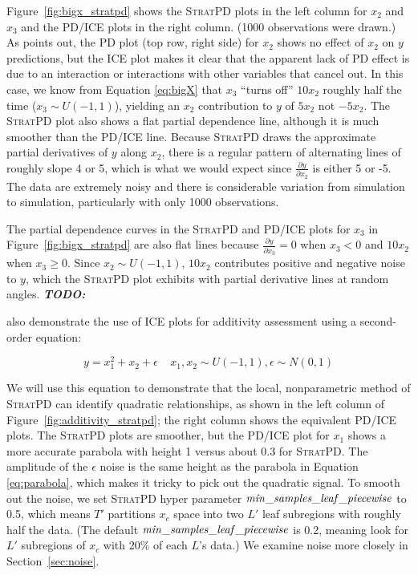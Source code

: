 \documentclass[12pt]{article}
\newcommand{\secref}[1]{Section~\ref{#1}}
\newcommand{\figref}[1]{Figure~\ref{#1}}
\newcommand{\todo}[1]{{\bf\em TODO:} {{\color{red}{#1}}}}
\newcommand{\spd}{\fontfamily{cmr}\textsc{\small StratPD}}
\begin{document}
\noindent \figref{fig:bigx_stratpd} shows the \spd{} plots in the left column for $x_2$ and $x_3$ and the PD/ICE plots in the right column. (1000 observations were drawn.) As \cite{ICE} points out, the PD plot (top row, right side) for $x_2$ shows no effect of $x_2$ on $y$ predictions, but the ICE plot makes it clear that the apparent lack of PD effect is due to an interaction or interactions with other variables that cancel out. In this case, we know from Equation \eqref{eq:bigX} that $x_3$ ``turns off'' $10 x_2$ roughly half the time ($x_3 \sim U(-1,1)$), yielding an $x_2$ contribution to $y$ of $5 x_2$ not $-5 x_2$. The \spd{} plot also shows a flat partial dependence line, although it is much smoother than the PD/ICE line. Because \spd{} draws the approximate partial derivatives of $y$ along $x_2$, there is a regular pattern of alternating lines of roughly slope 4 or 5, which is what we would expect since $\frac{\partial y}{\partial x_2}$ is either 5 or -5. The data are extremely noisy and there is considerable variation from simulation to simulation, particularly with only 1000 observations.

The partial dependence curves in the \spd{} and PD/ICE plots for $x_3$ in \figref{fig:bigx_stratpd} are also flat lines because $\frac{\partial y}{\partial x_3}=0$ when $x_3 < 0$ and $10 x_2$ when $x_3 \ge 0$. Since $x_2 \sim U(-1,1)$, $10 x_2$ contributes positive and negative noise to $y$, which the \spd{} plot exhibits with partial derivative lines at random angles.   \todo{James: can you check the ICE paper when they describe that the interactions of $x_3$ are just around 0?  From the equation they are clearly $\ge 0$.}

\cite{ICE} also demonstrate the use of ICE plots for additivity assessment using a second-order equation:

\begin{equation}\label{eq:parabola}
y = x_1^2 + x_2 + \epsilon~~~~~x_1, x_2 \sim U(-1,1), \epsilon \sim N(0,1)
\end{equation}

\noindent We will use this equation to demonstrate that the local, nonparametric method of \spd{} can identify quadratic relationships, as shown in the left column of \figref{fig:additivity_stratpd}; the right column shows the equivalent PD/ICE plots. The \spd{} plots are smoother, but the PD/ICE plot for $x_1$ shows a more accurate parabola with height 1 versus about 0.3 for \spd{}. The amplitude of the $\epsilon$ noise is the same height as the parabola in Equation \eqref{eq:parabola}, which makes it tricky to pick out the quadratic signal.  To smooth out the noise, we set \spd{} hyper parameter ${\it min\_samples\_leaf\_piecewise}$ to 0.5, which means $T'$ partitions $x_c$ space into two $L'$ leaf subregions with roughly half the data. (The default ${\it min\_samples\_leaf\_piecewise}$ is 0.2, meaning look for $L'$ subregions of $x_c$ with 20\% of each $L$'s data.) We examine noise more closely in \secref{sec:noise}.
\end{document}
